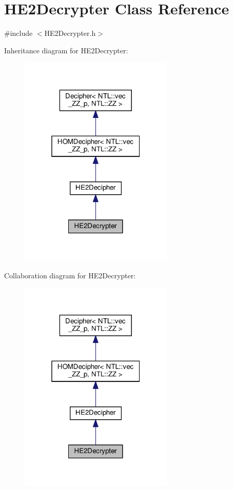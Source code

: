 \hypertarget{classHE2Decrypter}{}\section{H\+E2\+Decrypter Class Reference}
\label{classHE2Decrypter}


{\ttfamily \#include $<$H\+E2\+Decrypter.\+h$>$}



Inheritance diagram for H\+E2\+Decrypter\+:
\nopagebreak
\begin{figure}[H]
\begin{center}
\leavevmode
\includegraphics[width=208pt]{classHE2Decrypter__inherit__graph}
\end{center}
\end{figure}


Collaboration diagram for H\+E2\+Decrypter\+:
\nopagebreak
\begin{figure}[H]
\begin{center}
\leavevmode
\includegraphics[width=208pt]{classHE2Decrypter__coll__graph}
\end{center}
\end{figure}
